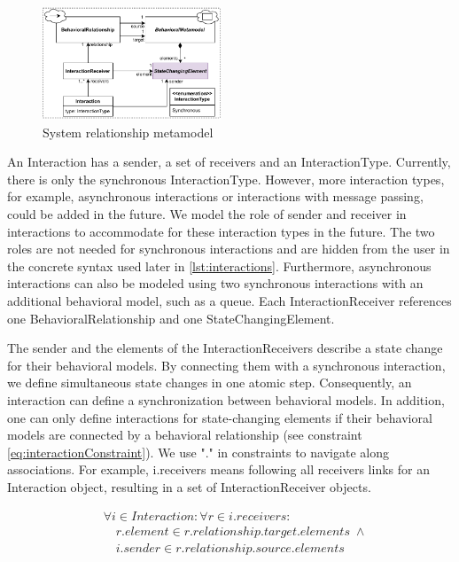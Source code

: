 \documentclass{jot}
\begin{document}
\begin{figure}[h]
    \centering
    \includegraphics[width=0.475\textwidth]{figures/srm_metamodel.pdf}
    \caption{System relationship metamodel}
    \label{fig:srm_metamodel}
\end{figure}

An \textsf{Interaction} has a \textsf{sender}, a set of \textsf{receivers} and an \textsf{InteractionType}.
Currently, there is only the \textsf{synchronous} \textsf{InteractionType}.
However, more interaction types, for example, asynchronous interactions or interactions with message passing, could be added in the future.
We model the role of sender and receiver in interactions to accommodate for these interaction types in the future.
The two roles are not needed for synchronous interactions and are hidden from the user in the concrete syntax used later in \cref{lst:interactions}.
Furthermore, asynchronous interactions can also be modeled using two synchronous interactions with an additional behavioral model, such as a queue.
Each \textsf{InteractionReceiver} references one \textsf{BehavioralRelationship} and one \textsf{StateChangingElement}.

The \textsf{sender} and the elements of the \textsf{InteractionReceiver}s describe a state change for their behavioral models.
By connecting them with a synchronous interaction, we define simultaneous state changes in one atomic step. 
Consequently, an interaction can define a synchronization between behavioral models.
In addition, one can only define interactions for state-changing elements if their behavioral models are connected by a behavioral relationship (see constraint \eqref{eq:interactionConstraint}).
We use "." in constraints to navigate along associations.
For example, \textsf{i.receivers} means following all \textsf{receivers} links for an \textsf{Interaction} object, resulting in a set of \textsf{InteractionReceiver} objects.

\begin{equation} \label{eq:interactionConstraint}
    \begin{aligned}
    & \forall i \in Interaction: \forall r \in i.receivers : \\
    & \quad r.element \in r.relationship.target.elements \; \wedge \\
    & \quad i.sender \in r.relationship.source.elements
    \end{aligned}
\end{equation}
\end{document}

